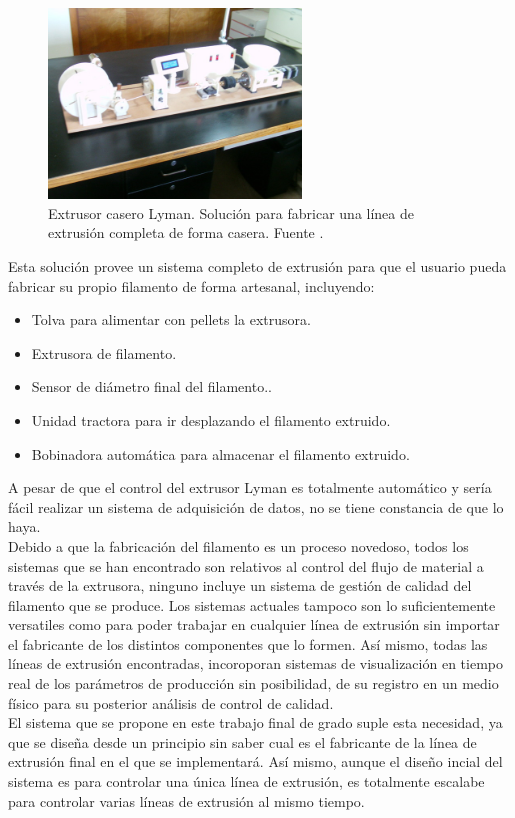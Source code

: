 \begin{figure}[h!]
    \centering
    \includegraphics[width=0.6\textwidth]{images/lyman.jpg}
    \caption[Extrusor casero Lyman.]{Extrusor casero Lyman. Solución para fabricar una línea de extrusión completa de forma casera. Fuente \cite{lyman}.}
    \label{fig:extr_lyman}
\end{figure}

Esta solución provee un sistema completo de extrusión para que el usuario pueda fabricar su propio filamento de forma artesanal, incluyendo:

\begin{itemize}
    \item{Tolva para alimentar con pellets la extrusora.}
    \item{Extrusora de filamento.}
    \item{Sensor de diámetro final del filamento..}
    \item{Unidad tractora para ir desplazando el filamento extruido.}
    \item{Bobinadora automática para almacenar el filamento extruido.}
\end{itemize}

A pesar de que el control del extrusor Lyman es totalmente automático y sería fácil realizar un sistema de adquisición de datos, no se tiene constancia de que lo haya.\\

Debido a que la fabricación del filamento es un proceso novedoso, todos los sistemas que se han encontrado son relativos al control del flujo de material a través de la extrusora, ninguno incluye un sistema de gestión de calidad del filamento que se produce. Los sistemas actuales tampoco son lo suficientemente versatiles como para poder trabajar en cualquier línea de extrusión sin importar el fabricante de los distintos componentes que lo formen. Así mismo, todas las líneas de extrusión encontradas, incoroporan sistemas de visualización en tiempo real de los parámetros de producción sin posibilidad, de su registro en un medio físico para su posterior análisis de control de calidad.\\

El sistema que se propone en este trabajo final de grado suple esta necesidad, ya que se diseña desde un principio sin saber cual es el fabricante de la línea de extrusión final en el que se implementará. Así mismo, aunque el diseño incial del sistema es para controlar una única línea de extrusión, es totalmente escalabe para controlar varias líneas de extrusión al mismo tiempo.

